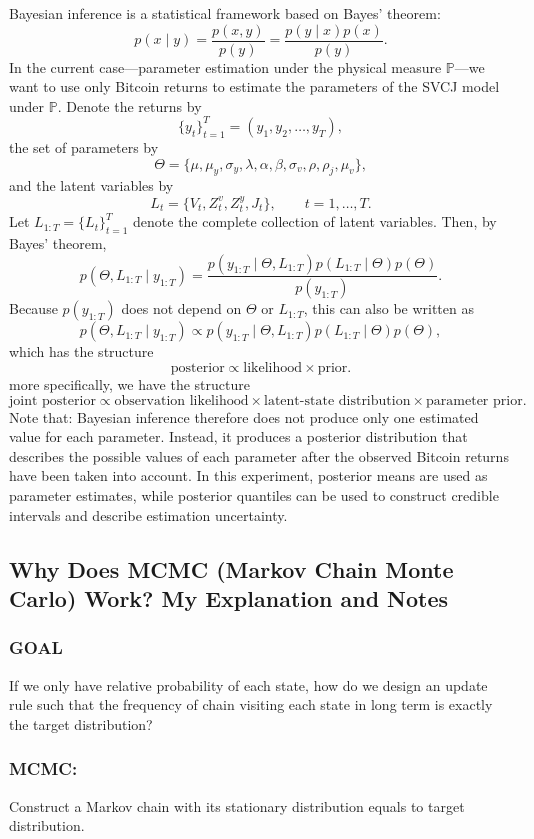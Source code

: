 \documentclass[11pt]{article}
\begin{document}
Bayesian inference is a statistical framework based on Bayes’ theorem:
\[
p(x\mid y)
=
\frac{p(x,y)}{p(y)}
=
\frac{p(y\mid x)p(x)}{p(y)}.
\]In the current case—parameter estimation under the physical measure \(\mathbb{P}\)—we want to use only Bitcoin returns to estimate the parameters of the SVCJ model under \(\mathbb{P}\). Denote the returns by
\[
\{y_t\}_{t=1}^{T}=(y_1,y_2,\ldots,y_T),
\]the set of parameters by
\[
\Theta
=
\{\mu,\mu_y,\sigma_y,\lambda,\alpha,\beta,
\sigma_v,\rho,\rho_j,\mu_v\},
\]and the latent variables by
\[
L_t=\{V_t,Z_t^v,Z_t^y,J_t\},
\qquad t=1,\ldots,T.
\]Let \(L_{1:T}=\{L_t\}_{t=1}^{T}\) denote the complete collection of latent variables. Then, by Bayes’ theorem,
\[
p(\Theta,L_{1:T}\mid y_{1:T})
=
\frac{
p(y_{1:T}\mid\Theta,L_{1:T})
p(L_{1:T}\mid\Theta)
p(\Theta)
}{
p(y_{1:T})
}.
\]Because \(p(y_{1:T})\) does not depend on \(\Theta\) or \(L_{1:T}\), this can also be written as
\[
p(\Theta,L_{1:T}\mid y_{1:T})
\propto
p(y_{1:T}\mid\Theta,L_{1:T})
p(L_{1:T}\mid\Theta)
p(\Theta),
\]which has the structure
\[
\text{posterior}
\propto
\text{likelihood}\times\text{prior}.
\]
more specifically, we have the structure
\[\text{joint posterior}
\propto
\text{observation likelihood}
\times
\text{latent-state distribution}
\times
\text{parameter prior}.\]
Note that: Bayesian inference therefore does not produce only one estimated value for each parameter. Instead, it produces a posterior distribution that describes the possible values of each parameter after the observed Bitcoin returns have been taken into account. In this experiment, posterior means are used as parameter estimates, while posterior quantiles can be used to construct credible intervals and describe estimation uncertainty.
\clearpage
\subsection*{Why Does MCMC (Markov Chain Monte Carlo) Work? My Explanation and Notes}
\subsubsection*{GOAL}

If we only have relative probability of each state, how do we design an update rule such that the frequency of chain visiting each state in long term is exactly the target distribution?

\subsubsection*{MCMC:}
Construct a Markov chain with its stationary distribution equals to target distribution.
\end{document}
